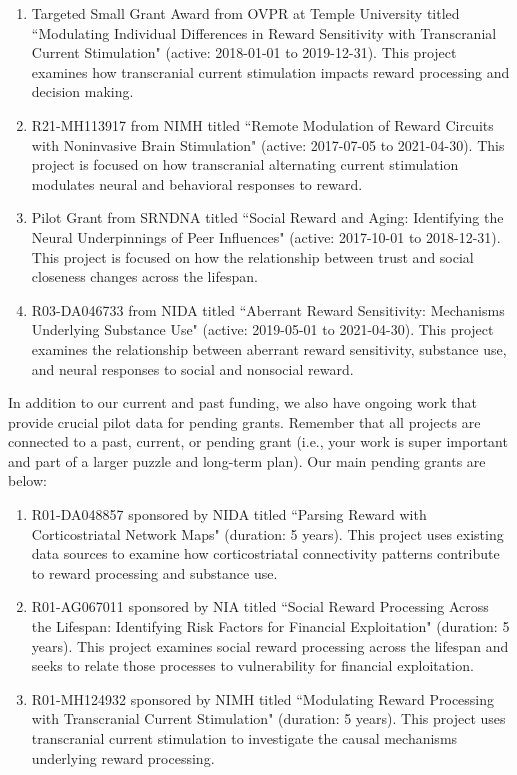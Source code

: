 \documentclass[letterpaper,11pt,oneside]{memoir}
\begin{document}
\begin{enumerate}
\item Targeted Small Grant Award from OVPR at Temple University titled ``Modulating Individual Differences in Reward Sensitivity with Transcranial Current Stimulation" (active: 2018-01-01 to 2019-12-31). This project examines how transcranial current stimulation impacts reward processing and decision making.
\item R21-MH113917 from NIMH titled ``Remote Modulation of Reward Circuits with Noninvasive Brain Stimulation" (active: 2017-07-05 to 2021-04-30). This project is focused on how transcranial alternating current stimulation modulates neural and behavioral responses to reward. 
\item Pilot Grant from SRNDNA titled ``Social Reward and Aging: Identifying the Neural Underpinnings of Peer Influences" (active: 2017-10-01 to 2018-12-31). This project is focused on how the relationship between trust and social closeness changes across the lifespan. 
\item R03-DA046733 from NIDA titled ``Aberrant Reward Sensitivity: Mechanisms Underlying Substance Use" (active: 2019-05-01 to 2021-04-30). This project examines the relationship between aberrant reward sensitivity, substance use, and neural responses to social and nonsocial reward. 
\end{enumerate}

In addition to our current and past funding, we also have ongoing work that provide crucial pilot data for pending grants. Remember that all projects are connected to a past, current, or pending grant (i.e., your work is super important and part of a larger puzzle and long-term plan). Our main pending grants are below:

\begin{enumerate}
\item R01-DA048857 sponsored by NIDA titled ``Parsing Reward with Corticostriatal Network Maps" (duration: 5 years). This project uses existing data sources to examine how corticostriatal connectivity patterns contribute to reward processing and substance use.
\item R01-AG067011 sponsored by NIA titled ``Social Reward Processing Across the Lifespan: Identifying Risk Factors for Financial Exploitation" (duration: 5 years). This project examines social reward processing across the lifespan and seeks to relate those processes to vulnerability for financial exploitation.
\item R01-MH124932 sponsored by NIMH titled ``Modulating Reward Processing with Transcranial Current Stimulation" (duration: 5 years). This project uses transcranial current stimulation to investigate the causal mechanisms underlying reward processing.
\end{enumerate}
\end{document}
